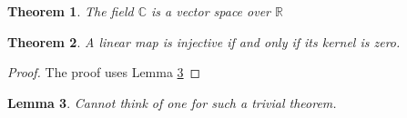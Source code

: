 \documentclass[11pt]{amsart}
\newcommand{\R}{\mathbb R}
\newcommand{\C}{\mathbb C}
\newtheorem{theorem}{Theorem}
\newtheorem{lemma}[theorem]{Lemma}
\begin{document}
\begin{theorem} 
The field $\C$ is a vector space over $\R$
\end{theorem}



\begin{theorem}
A linear map is injective if and only if its kernel is zero.
\end{theorem}

\begin{proof} 
The proof uses Lemma \ref{nolemma}
\end{proof}


\begin{lemma} \label{nolemma}
Cannot think of one for such a trivial theorem. 
\end{lemma}
\end{document}
